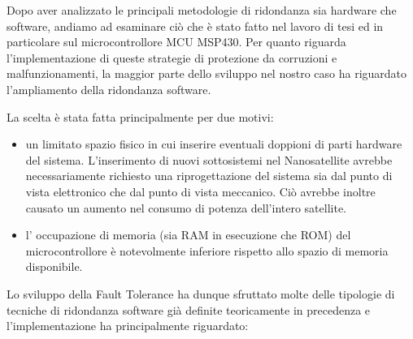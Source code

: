 \documentclass[LaM,binding=0.6cm,oneside]{../sapthesis}
\begin{document}
Dopo aver analizzato le principali metodologie di ridondanza sia hardware che software, andiamo ad esaminare ciò che è stato fatto nel lavoro di tesi ed in particolare sul microcontrollore MCU MSP430.
\newline
Per quanto riguarda l'implementazione di queste strategie di protezione da corruzioni e malfunzionamenti, la maggior parte dello sviluppo nel nostro caso ha riguardato l'ampliamento della ridondanza software.

La scelta è stata fatta principalmente per due motivi:
\begin{itemize}
    \item un limitato spazio fisico in cui inserire eventuali doppioni di parti hardware del sistema. L'inserimento di nuovi sottosistemi nel Nanosatellite avrebbe necessariamente richiesto una riprogettazione del sistema sia dal punto di vista elettronico che dal punto di vista meccanico. Ciò avrebbe inoltre causato un aumento nel consumo di potenza dell'intero satellite.
    
    \item l' occupazione di memoria (sia RAM in esecuzione che ROM) del microcontrollore è notevolmente inferiore rispetto allo spazio di memoria disponibile.
\end{itemize}
\newline
Lo sviluppo della Fault Tolerance ha dunque sfruttato molte delle tipologie di tecniche di ridondanza software già definite teoricamente in precedenza e l'implementazione ha principalmente riguardato:
\end{document}
